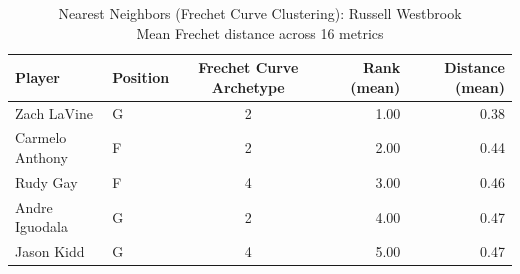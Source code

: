 \begin{table}[t]
\caption*{
{\fontsize{20}{25} Nearest Neighbors (Frechet Curve Clustering): Russell Westbrook\fontsize{12}{15}\selectfont } \\ 
{\fontsize{14}{17}\selectfont  Mean Frechet distance across 16 metrics\fontsize{12}{15}\selectfont }
} 
\fontsize{12.0pt}{14.0pt}\selectfont
\begin{tabular*}{\linewidth}{@{\extracolsep{\fill}}llcrr}
\toprule
Player & Position & Frechet Curve Archetype & Rank (mean) & Distance (mean) \\ 
\midrule\addlinespace[2.5pt]
Zach LaVine & G & 2 & 1.00 & 0.38 \\ 
Carmelo Anthony & F & 2 & 2.00 & 0.44 \\ 
Rudy Gay & F & 4 & 3.00 & 0.46 \\ 
Andre Iguodala & G & 2 & 4.00 & 0.47 \\ 
Jason Kidd & G & 4 & 5.00 & 0.47 \\ 
\bottomrule
\end{tabular*}
\end{table}


